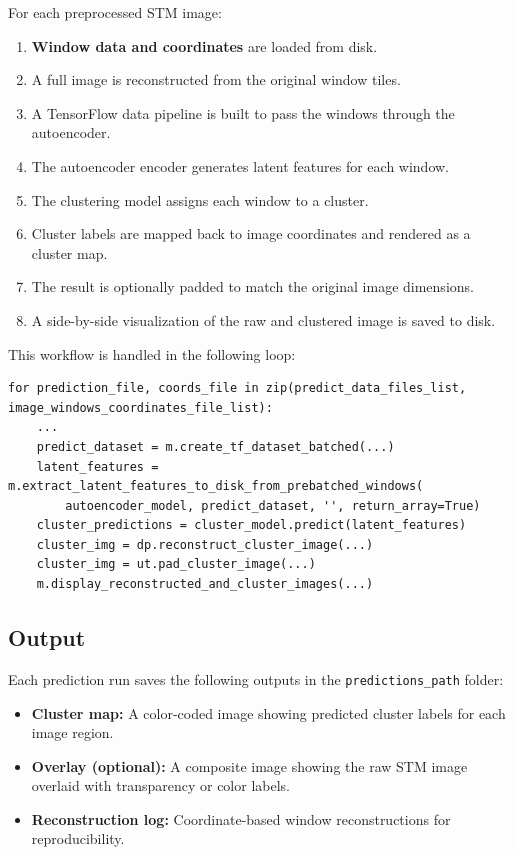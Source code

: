 \documentclass[11pt]{article}
\begin{document}
For each preprocessed STM image:

\begin{enumerate}
  \item \textbf{Window data and coordinates} are loaded from disk.
  \item A full image is reconstructed from the original window tiles.
  \item A TensorFlow data pipeline is built to pass the windows through the autoencoder.
  \item The autoencoder encoder generates latent features for each window.
  \item The clustering model assigns each window to a cluster.
  \item Cluster labels are mapped back to image coordinates and rendered as a cluster map.
  \item The result is optionally padded to match the original image dimensions.
  \item A side-by-side visualization of the raw and clustered image is saved to disk.
\end{enumerate}

This workflow is handled in the following loop:

\begin{verbatim}
for prediction_file, coords_file in zip(predict_data_files_list, image_windows_coordinates_file_list):
    ...
    predict_dataset = m.create_tf_dataset_batched(...)
    latent_features = m.extract_latent_features_to_disk_from_prebatched_windows(
        autoencoder_model, predict_dataset, '', return_array=True)
    cluster_predictions = cluster_model.predict(latent_features)
    cluster_img = dp.reconstruct_cluster_image(...)
    cluster_img = ut.pad_cluster_image(...)
    m.display_reconstructed_and_cluster_images(...)
\end{verbatim}

\subsection*{Output}

Each prediction run saves the following outputs in the \texttt{predictions\_path} folder:

\begin{itemize}
  \item \textbf{Cluster map:} A color-coded image showing predicted cluster labels for each image region.
  \item \textbf{Overlay (optional):} A composite image showing the raw STM image overlaid with transparency or color labels.
  \item \textbf{Reconstruction log:} Coordinate-based window reconstructions for reproducibility.
\end{itemize}
\end{document}

